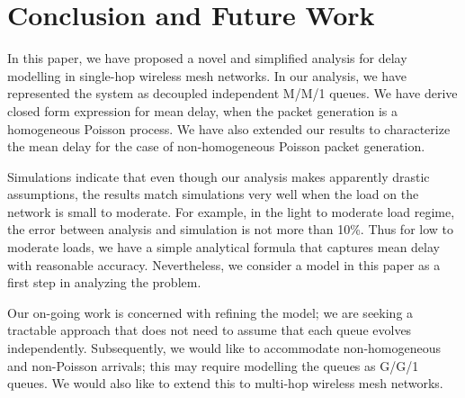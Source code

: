 \documentclass[10pt, conference, compsocconf]{IEEEtran}
\begin{document}
\section{\large{Conclusion and Future Work}}
In this paper, we have proposed a novel and simplified  analysis for delay modelling in single-hop wireless mesh networks. In our analysis, we have represented the system as decoupled independent M/M/1 queues. We have derive closed form expression for mean delay, when the packet generation is a homogeneous Poisson process. We have also extended our results to characterize the mean delay for the case of non-homogeneous Poisson packet generation.

Simulations indicate that even though our analysis makes apparently drastic assumptions, the results match simulations very well when the load on the network is small to moderate. For example, in the light to moderate load regime, the error between analysis and simulation is not more than 10\%. Thus for low to moderate loads, we have a simple analytical formula that captures mean delay with reasonable accuracy. Nevertheless, we consider a model in this paper as a first step in analyzing the problem.

Our on-going work is concerned with refining the model; we are seeking a tractable approach that does not need to assume that each queue evolves independently. Subsequently, we would like to accommodate non-homogeneous and non-Poisson arrivals; this may require modelling the queues as G/G/1 queues. We would also like to extend this to multi-hop wireless mesh networks.



\end{document}
